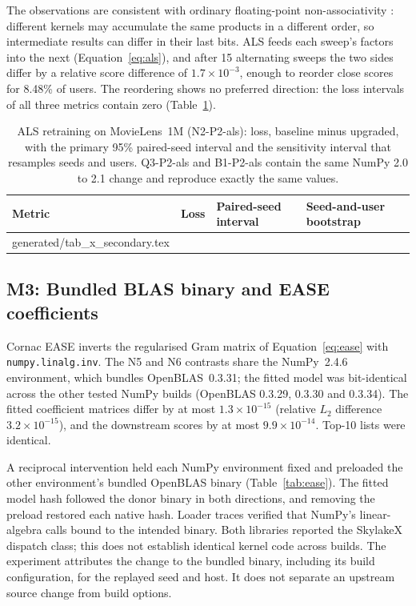 \documentclass[11pt,a4paper]{article}
\makeatletter
\newcommand{\tablebody}[1]{\@@input generated/#1.tex }
\makeatother
\begin{document}
The observations are consistent with ordinary floating-point
non-associativity \citep{higham2002accuracy}: different kernels may accumulate
the same products in a different order, so intermediate results can differ in
their last bits. ALS feeds each sweep's factors into the next
(Equation~\ref{eq:als}), and after 15 alternating sweeps the two sides differ
by a relative score difference of $1.7\times10^{-3}$, enough to reorder close
scores for 8.48\% of users. The reordering shows no preferred direction: the
loss intervals of all three metrics contain zero
(Table~\ref{tab:secondary}).

\begin{table}[htbp]
  \centering
  \caption{ALS retraining on MovieLens~1M (N2-P2-als): loss, baseline minus
    upgraded, with the primary 95\% paired-seed interval and the sensitivity
    interval that resamples seeds and users. Q3-P2-als and B1-P2-als contain
    the same NumPy 2.0 to 2.1 change and reproduce exactly the same values.}
  \label{tab:secondary}
  \small
  \begin{tabular}{@{}llll@{}}
    \toprule
    Metric & Loss & Paired-seed interval & Seed-and-user bootstrap \\
    \midrule
    \tablebody{tab_x_secondary}
    \bottomrule
  \end{tabular}
\end{table}

\subsection{M3: Bundled BLAS binary and EASE coefficients}

Cornac EASE inverts the regularised Gram matrix of Equation~\eqref{eq:ease}
with \texttt{numpy.linalg.inv}. The N5 and N6 contrasts share the NumPy~2.4.6
environment, which bundles OpenBLAS~0.3.31; the fitted model was bit-identical
across the other tested NumPy builds (OpenBLAS 0.3.29, 0.3.30 and 0.3.34).
The fitted coefficient matrices differ by at most $1.3\times10^{-15}$
(relative $L_2$ difference $3.2\times10^{-15}$), and the downstream scores by
at most $9.9\times10^{-14}$. Top-10 lists were identical.

A reciprocal intervention held each NumPy environment fixed and preloaded the
other environment's bundled OpenBLAS binary (Table~\ref{tab:ease}). The fitted
model hash followed the donor binary in both directions, and removing the
preload restored each native hash. Loader traces verified that NumPy's
linear-algebra calls bound to the intended binary. Both libraries reported
the SkylakeX dispatch class; this does not establish identical kernel code
across builds. The experiment attributes the change to the bundled binary,
including its build configuration, for the replayed seed and host. It does not
separate an upstream source change from build options.
\end{document}
